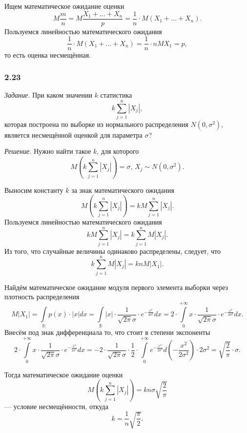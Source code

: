 Ищем математическое ожидание оценки
$$M \frac{m}{n} =
  M \frac{X_1 + \dotsc + X_n}{p} =
  \frac{1}{n} \cdot M \left( X_1 + \dotsc + X_n \right).$$
Пользуемся линейностью математического ожидания
$$ \frac{1}{n} \cdot M \left( X_1 + \dotsc + X_n \right) =
  \frac{1}{n} \cdot nMX_1 =
  p,$$
то есть оценка несмещённая.

\subsubsection*{2.23}

\textit{Задание.} При каком значении $k$ статистика
$$k \sum \limits_{j = 1}^n \left| X_j \right|,$$
которая построена по выборке из нормального распределения $N \left( 0, \sigma^2 \right) $,
является несмещённой оценкой для параметра $ \sigma $?

\textit{Решение.} Нужно найти такое $k$, для которого
$$M \left( k \sum \limits_{j = 1}^n \left| X_j \right| \right) =
  \sigma, \,
  X_j \sim N \left( 0, \sigma^2 \right).$$

Выносим константу $k$ за знак математического ожидания
$$M \left( k \sum \limits_{j = 1}^n \left| X_j \right| \right) =
  kM \sum \limits_{j = 1}^n \left| X_j \right|.$$
Пользуемся линейностью математического ожидания
$$kM \sum \limits_{j = 1}^n \left| X_j \right| =
  k \sum \limits_{j = 1}^n M \left| X_j \right|.$$
Из того, что случайные величины одинаково распределены, следует, что
$$k \sum \limits_{j = 1}^n M \left| X_j \right| =
  knM \left| X_1 \right|.$$

Найдём математическое ожидание модуля первого элемента выборки через плотность распределения
$$M \left| X_1 \right| =
  \int \limits_{ \mathbb{R}} p \left( x \right) \cdot \left| x \right| dx =
  \int \limits_{ \mathbb{R}}
    \left| x \right| \cdot \frac{1}{ \sqrt{2 \pi } \sigma } \cdot e^{- \frac{x^2}{2 \sigma^2}}
  dx =
  2 \cdot
  \int \limits_0^{+ \infty }
    x \cdot \frac{1}{ \sqrt{2 \pi } \sigma } \cdot e^{- \frac{x^2}{2 \sigma^2}}
  dx.$$
Внесём под знак дифференциала то, что стоит в степени экспоненты
$$2 \cdot
  \int \limits_0^{+ \infty }
    x \cdot \frac{1}{ \sqrt{2 \pi } \sigma } \cdot e^{- \frac{x^2}{2 \sigma^2}}
  dx =
  -2 \cdot \frac{1}{ \sqrt{2 \pi } \sigma } \cdot \frac{1}{2} \cdot
  \int \limits_0^{+ \infty }
    e^{- \frac{x^2}{2 \sigma^2}}
  d \left( - \frac{x^2}{2 \sigma^2} \right) \cdot
  2 \sigma^2 =
  \sqrt{ \frac{2}{ \pi }} \cdot \sigma.$$

Тогда математическое ожидание оценки
$$M \left( k \sum \limits_{j = 1}^n \left| X_j \right| \right) =
  kn \sigma \sqrt{ \frac{2}{ \pi }}$$
--- условие несмещённости, откуда
$$k =
  \frac{1}{n} \sqrt{ \frac{ \pi }{2}}.$$

